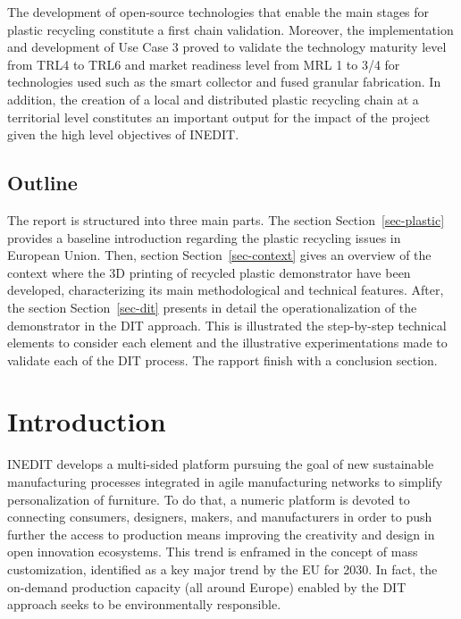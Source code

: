 \documentclass[
  11pt,
]{article}
\begin{document}
The development of open-source technologies that enable the main stages
for plastic recycling constitute a first chain validation. Moreover, the
implementation and development of Use Case 3 proved to validate the
technology maturity level from TRL4 to TRL6 and market readiness level
from MRL 1 to 3/4 for technologies used such as the smart collector and
fused granular fabrication. In addition, the creation of a local and
distributed plastic recycling chain at a territorial level constitutes
an important output for the impact of the project given the high level
objectives of INEDIT.

\hypertarget{outline}{%
\subsection{Outline}\label{outline}}

The report is structured into three main parts. The section
Section~\ref{sec-plastic} provides a baseline introduction regarding the
plastic recycling issues in European Union. Then, section
Section~\ref{sec-context} gives an overview of the context where the 3D
printing of recycled plastic demonstrator have been developed,
characterizing its main methodological and technical features. After,
the section Section~\ref{sec-dit} presents in detail the
operationalization of the demonstrator in the DIT approach. This is
illustrated the step-by-step technical elements to consider each element
and the illustrative experimentations made to validate each of the DIT
process. The rapport finish with a conclusion section.

\newpage

\hypertarget{introduction}{%
\section{Introduction}\label{introduction}}

INEDIT develops a multi-sided platform pursuing the goal of new
sustainable manufacturing processes integrated in agile manufacturing
networks to simplify personalization of furniture. To do that, a numeric
platform is devoted to connecting consumers, designers, makers, and
manufacturers in order to push further the access to production means
improving the creativity and design in open innovation ecosystems. This
trend is enframed in the concept of mass customization, identified as a
key major trend by the EU for 2030. In fact, the on-demand production
capacity (all around Europe) enabled by the DIT approach seeks to be
environmentally responsible.
\end{document}
